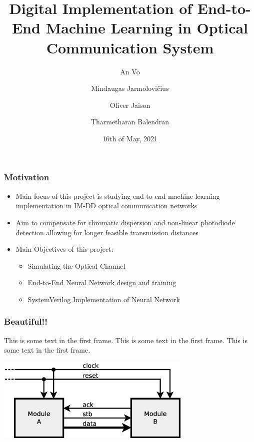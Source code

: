 \documentclass{beamer}
\title[Short Title]{Digital Implementation of End-to-End Machine Learning in Optical Communication System}
\author[Auth.1 \and Auth.2 \and Auth.3 \and Auth.4]{An Vo \\\and Mindaugas Jarmolovi\v{c}ius\\\and Oliver Jaison \\\and Tharmetharan Balendran}
\institute[UCL]{%
	Dept. of Electronic and Electrical Engineering \\ %
	University College London
}
\date{16th of May, 2021}
\begin{document}
	
	\frame{\titlepage}
	
	\begin{frame}
		\frametitle{Motivation}
		\begin{itemize}
		    \item Main focus of this project is studying end-to-end machine learning implementation in IM-DD optical communication networks
		    \item Aim to compensate for chromatic dispersion and non-linear photodiode detection allowing for longer feasible transmission distances
		    \item Main Objectives of this project:
		    \begin{itemize}
		        \item Simulating the Optical Channel
		        \item End-to-End Neural Network design and training
		        \item SystemVerilog Implementation of Neural Network
		    \end{itemize}
		\end{itemize}
	\end{frame}
	
	\begin{frame}
		\frametitle{Beautiful!!}
		This is some text in the first frame. This is some text in the first frame. This is some text in the first frame.
		
		\begin{center}
		    \includegraphics[width=0.7\textwidth]{resources/digital_circ/abus.eps}    
		\end{center}
		
	\end{frame}
	
\end{document}
